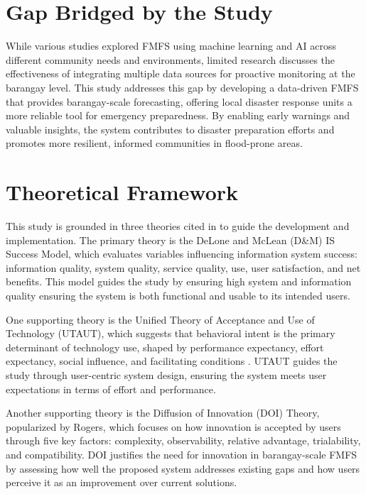 \documentclass{research}
\begin{document}
\section{Gap Bridged by the Study}

While various studies explored FMFS using machine learning and AI across different community needs and environments, limited research discusses the effectiveness of integrating multiple data sources for proactive monitoring at the barangay level. This study addresses this gap by developing a data-driven FMFS that provides barangay-scale forecasting, offering local disaster response units a more reliable tool for emergency preparedness. By enabling early warnings and valuable insights, the system contributes to disaster preparation efforts and promotes more resilient, informed communities in flood-prone areas.

\section{Theoretical Framework}

This study is grounded in three theories cited in \cite{hammood2021systematic} to guide the development and implementation. The primary theory is the DeLone and McLean (D\&M) IS Success Model, which evaluates variables influencing information system success: information quality, system quality, service quality, use, user satisfaction, and net benefits. This model guides the study by ensuring high system and information quality ensuring the system is both functional and usable to its intended users.

One supporting theory is the Unified Theory of Acceptance and Use of Technology (UTAUT), which suggests that behavioral intent is the primary determinant of technology use, shaped by performance expectancy, effort expectancy, social influence, and facilitating conditions \cite{venkatesh2003user}. UTAUT guides the study through user-centric system design, ensuring the system meets user expectations in terms of effort and performance.

Another supporting theory is the Diffusion of Innovation (DOI) Theory, popularized by Rogers, which focuses on how innovation is accepted by users through five key factors: complexity, observability, relative advantage, trialability, and compatibility. DOI justifies the need for innovation in barangay-scale FMFS by assessing how well the proposed system addresses existing gaps and how users perceive it as an improvement over current solutions.
\end{document}
